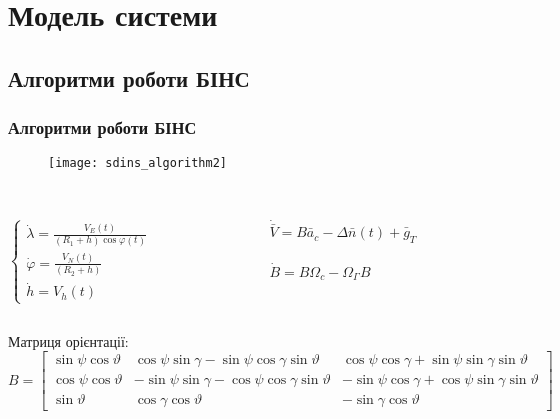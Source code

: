 \documentclass[ucs,compress]{beamer}    %
\begin{document}
\section{Модель системи }
\subsection{Алгоритми роботи БІНС}

 
\begin{frame}
\frametitle{Алгоритми роботи БІНС}

\begin{figure}[here]
\centering
\texttt{[image: sdins\_algorithm2]}
\end{figure}
\tiny

\begin{columns}[t]
\begin{column}{5cm}
\\
$\left\{ \begin{array}{l} 
{\dot{\lambda }=\frac{V_{E} \left(t\right)}{\left(R_{1} +h\right)\cos \varphi \left(t\right)} } \\ 
{\dot{\varphi }=\frac{V_{N} \left(t\right)}{\left(R_{2} +h\right)} } \\ 
{\dot{h}=V_{h} \left(t\right)} \end{array}\right .$    \\ 

\end{column}
\begin{column}{5cm}
 \\
$\dot{\bar{V}}=B\bar{a}{}_{c} -\Delta \bar{n}\left(t\right)+\bar{g}_{T} $\\
\\
$\dot{B}=B\Omega _{c} -\Omega _{\Gamma } B$\\
\end{column}
\end{columns}

Матриця орієнтації:\\
$B%
=\left[\begin{array}{ccc} 
{\sin \psi \cos \vartheta } & {\cos \psi \sin \gamma -\sin \psi \cos \gamma \sin \vartheta } & {\cos \psi \cos 
\gamma +\sin \psi \sin \gamma \sin \vartheta } \\ 
{\cos \psi \cos \vartheta } & {-\sin \psi \sin \gamma -\cos \psi \cos \gamma \sin \vartheta } & {-\sin \psi \cos \gamma +\cos \psi \sin \gamma \sin \vartheta } \\ 
{\sin \vartheta } & {\cos \gamma \cos \vartheta } & {-\sin \gamma \cos \vartheta } \end{array}\right]$



\end{frame}
\end{document}
